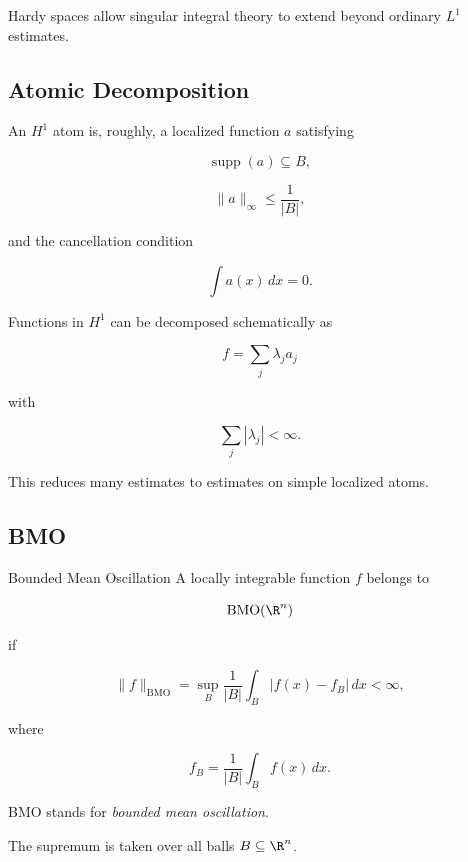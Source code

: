 Hardy spaces allow singular integral theory to extend beyond ordinary
\(L^1\) estimates.

\subsection{Atomic Decomposition}
\label{subsec:hardy-atomic}

An \(H^1\) atom is, roughly, a localized function \(a\) satisfying

\[
\boxed{
\operatorname{supp}(a)\subseteq B,
}
\]

\[
\boxed{
\|a\|_\infty
\leq
\frac{1}{|B|},
}
\]

and the cancellation condition

\[
\boxed{
\int a(x)\,dx=0.
}
\]

Functions in \(H^1\) can be decomposed schematically as

\[
\boxed{
f
=
\sum_j\lambda_ja_j
}
\]

with

\[
\boxed{
\sum_j|\lambda_j|<\infty.
}
\]

This reduces many estimates to estimates on simple localized atoms.

\subsection{BMO}
\label{subsec:bmo}

\begin{definitionbox}{Bounded Mean Oscillation}
A locally integrable function \(f\) belongs to

\[
\operatorname{BMO}(\R^n)
\]

if

\[
\boxed{
\|f\|_{\operatorname{BMO}}
=
\sup_B
\frac{1}{|B|}
\int_B
|f(x)-f_B|\,dx
<\infty,
}
\]

where

\[
\boxed{
f_B
=
\frac{1}{|B|}
\int_Bf(x)\,dx.
}
\]
\end{definitionbox}

BMO stands for \emph{bounded mean oscillation}.

The supremum is taken over all balls \(B\subseteq\R^n\).

